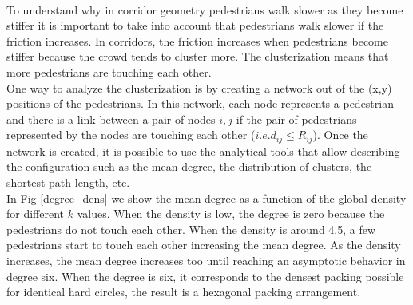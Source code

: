\documentclass[preprint,12pt]{elsarticle}
\begin{document}
\begin{figure}[!htbp]
\centering
    \ 
    \\
\caption[width=0.47\columnwidth]{}
\label{flow_density}
\end{figure}

To understand why in corridor geometry pedestrians walk slower as they become stiffer it is important to take into account that pedestrians walk slower if the friction increases. In corridors, the friction increases when pedestrians become stiffer because the crowd tends to cluster more. The clusterization means that more pedestrians are touching each other. \\

One way to analyze the clusterization is by creating a network out of the (x,y) positions of the pedestrians. In this network, each node represents a pedestrian and there is a link between a pair of nodes $i,j$ if the pair of pedestrians represented by the nodes are touching each other ($i.e. d_{ij} \leq R_{ij}$). Once the network is created, it is possible to use the analytical tools that allow describing the configuration such as the mean degree, the distribution of clusters, the shortest path length, etc.\\  

In Fig \ref{degree_dens} we show the mean degree as a function of the global density for different $k$ values. When the density is low,  the degree is zero because the pedestrians do not touch each other. When the density is around 4.5, a few pedestrians start to touch each other increasing the mean degree. As the density increases, the mean degree increases too until reaching an asymptotic behavior in degree six. When the degree is six, it corresponds to the densest packing possible for identical hard circles, the result is a hexagonal packing arrangement.\\
\end{document}

